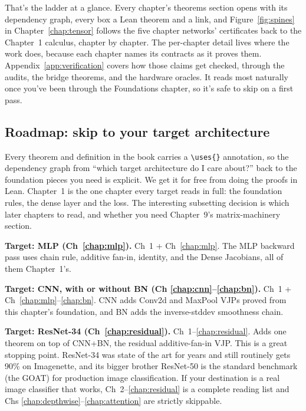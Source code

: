 That's the ladder at a glance. Every chapter's theorems section opens
with its dependency graph, every box a Lean theorem and a link, and
Figure~\ref{fig:spines} in Chapter~\ref{chap:tensor} follows the five
chapter networks' certificates back to the Chapter~1 calculus, chapter by
chapter. The per-chapter detail lives where the work does, because each
chapter names its contracts as it proves them. Appendix~\ref{app:verification}
covers how those claims get checked, through the audits, the bridge
theorems, and the hardware oracles. It reads most naturally once you've
been through the Foundations chapter, so it's safe to skip on a first
pass.

\subsection*{Roadmap: skip to your target architecture}

Every theorem and definition in the book carries a
\texttt{\textbackslash uses\{\}} annotation, so the dependency graph from
``which target architecture do I care about?'' back to the foundation
pieces you need is explicit. We get it for free from doing the proofs in
Lean. Chapter~1 is the one chapter every target reads in full: the
foundation rules, the dense layer and the loss. The interesting subsetting decision is
which later chapters to read, and whether you need Chapter~9's
matrix-machinery section.

\textbf{Target: MLP (Ch~\ref{chap:mlp}).} Ch~1 + Ch~\ref{chap:mlp}.
The MLP backward pass uses chain rule, additive fan-in, identity,
and the Dense Jacobians, all of them Chapter~1's.

\textbf{Target: CNN, with or without BN (Ch \ref{chap:cnn}--\ref{chap:bn}).}
Ch~1 + Ch~\ref{chap:mlp}--\ref{chap:bn}. CNN adds Conv2d and MaxPool
VJPs proved from this chapter's foundation, and BN adds the
inverse-stddev smoothness chain.

\textbf{Target: ResNet-34 (Ch~\ref{chap:residual}).} Ch~1--\ref{chap:residual}.
Adds one theorem on top of CNN+BN, the residual additive-fan-in VJP.
This is a great stopping point. ResNet-34 was state of the
art for years and still routinely gets 90\% on Imagenette, and its
bigger brother ResNet-50 is the standard benchmark (the GOAT) for
production image classification. If your destination is a real
image classifier that works, Ch~2--\ref{chap:residual} is a complete
reading list and Chs \ref{chap:depthwise}--\ref{chap:attention} are
strictly skippable.

